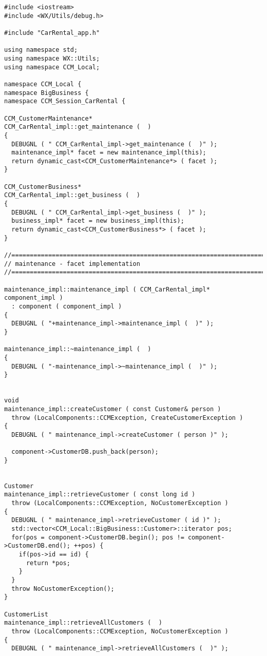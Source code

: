 \begin{scriptsize}
\begin{verbatim}
#include <iostream>
#include <WX/Utils/debug.h>

#include "CarRental_app.h"

using namespace std;
using namespace WX::Utils;
using namespace CCM_Local;

namespace CCM_Local {
namespace BigBusiness {
namespace CCM_Session_CarRental {

CCM_CustomerMaintenance*
CCM_CarRental_impl::get_maintenance (  )
{
  DEBUGNL ( " CCM_CarRental_impl->get_maintenance (  )" );
  maintenance_impl* facet = new maintenance_impl(this);
  return dynamic_cast<CCM_CustomerMaintenance*> ( facet );
}

CCM_CustomerBusiness*
CCM_CarRental_impl::get_business (  )
{
  DEBUGNL ( " CCM_CarRental_impl->get_business (  )" );
  business_impl* facet = new business_impl(this);
  return dynamic_cast<CCM_CustomerBusiness*> ( facet );
}

//==============================================================================
// maintenance - facet implementation
//==============================================================================

maintenance_impl::maintenance_impl ( CCM_CarRental_impl* component_impl )
  : component ( component_impl )
{
  DEBUGNL ( "+maintenance_impl->maintenance_impl (  )" );
}

maintenance_impl::~maintenance_impl (  )
{
  DEBUGNL ( "-maintenance_impl->~maintenance_impl (  )" );
}


void
maintenance_impl::createCustomer ( const Customer& person )
  throw (LocalComponents::CCMException, CreateCustomerException )
{
  DEBUGNL ( " maintenance_impl->createCustomer ( person )" );

  component->CustomerDB.push_back(person);
}


Customer
maintenance_impl::retrieveCustomer ( const long id )
  throw (LocalComponents::CCMException, NoCustomerException )
{
  DEBUGNL ( " maintenance_impl->retrieveCustomer ( id )" );
  std::vector<CCM_Local::BigBusiness::Customer>::iterator pos;
  for(pos = component->CustomerDB.begin(); pos != component->CustomerDB.end(); ++pos) {
    if(pos->id == id) {
      return *pos;
    }
  }
  throw NoCustomerException();
}

CustomerList
maintenance_impl::retrieveAllCustomers (  )
  throw (LocalComponents::CCMException, NoCustomerException )
{
  DEBUGNL ( " maintenance_impl->retrieveAllCustomers (  )" );


\end{verbatim}
\end{scriptsize}
